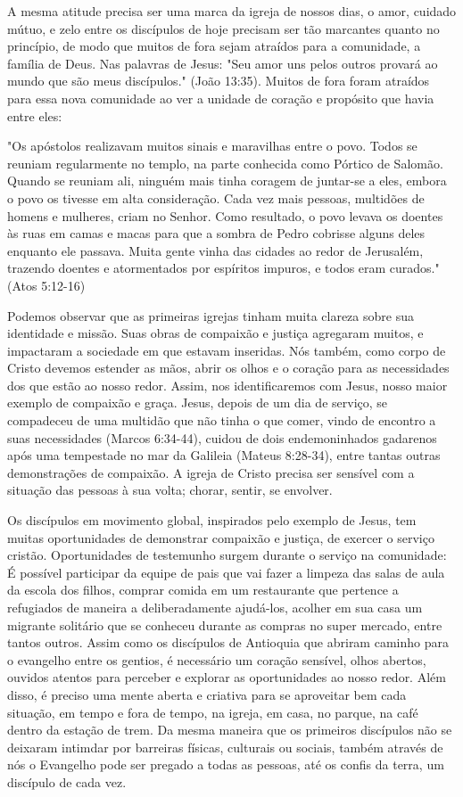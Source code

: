 \documentclass[12pt,openright,oneside,a4paper,
english,french,spanish,brazil]{abntex2}
\begin{document}
A mesma atitude precisa ser uma marca da igreja de nossos dias, o amor, cuidado mútuo, e zelo entre os discípulos de hoje precisam ser tão marcantes quanto no princípio, de modo que muitos de fora sejam atraídos para a comunidade, a família de Deus. Nas palavras de Jesus: "Seu amor uns pelos outros provará ao mundo que são meus discípulos." (João 13:35). Muitos de fora foram atraídos para essa nova comunidade ao ver a unidade de coração e propósito que havia entre eles:

\begin{citacao}"Os apóstolos realizavam muitos sinais e maravilhas entre o povo. Todos se reuniam regularmente no templo, na parte conhecida como Pórtico de Salomão. Quando se reuniam ali, ninguém mais tinha coragem de juntar-se a eles, embora o povo os tivesse em alta consideração. Cada vez mais pessoas, multidões de homens e mulheres, criam no Senhor. Como resultado, o povo levava os doentes às ruas em camas e macas para que a sombra de Pedro cobrisse alguns deles enquanto ele passava. Muita gente vinha das cidades ao redor de Jerusalém, trazendo doentes e atormentados por espíritos impuros, e todos eram curados." (Atos 5:12-16)\end{citacao}

Podemos observar que as primeiras igrejas tinham muita clareza sobre sua identidade e missão. Suas obras de compaixão e justiça agregaram muitos, e impactaram a sociedade em que estavam inseridas. Nós também, como corpo de Cristo devemos estender as mãos, abrir os olhos e o coração para as necessidades dos que estão ao nosso redor. Assim, nos identificaremos com Jesus, nosso maior exemplo de compaixão e graça. Jesus, depois de um dia de serviço, se compadeceu de uma multidão que não tinha o que comer, vindo de encontro a suas necessidades (Marcos 6:34-44), cuidou de dois endemoninhados gadarenos após uma tempestade no mar da Galileia (Mateus 8:28-34), entre tantas outras demonstrações de compaixão. A igreja de Cristo precisa ser sensível com a situação das pessoas à sua volta; chorar, sentir, se envolver\cite[p. 172]{brandao}.

Os discípulos em movimento global, inspirados pelo exemplo de Jesus, tem muitas oportunidades de demonstrar compaixão e justiça, de exercer o serviço cristão. Oportunidades de testemunho surgem durante o serviço na comunidade: É possível participar da equipe de pais que vai fazer a limpeza das salas de aula da escola dos filhos, comprar comida em um restaurante que pertence a refugiados de maneira a deliberadamente ajudá-los, acolher em sua casa um migrante solitário que se conheceu durante as compras no super mercado, entre tantos outros. Assim como os discípulos de Antioquia que abriram caminho para o evangelho entre os gentios, é necessário um coração sensível, olhos abertos, ouvidos atentos para perceber e explorar as oportunidades ao nosso redor. Além disso, é preciso uma mente aberta e criativa para se aproveitar bem cada situação, em tempo e fora de tempo, na igreja, em casa, no parque, na café dentro da estação de trem. Da mesma maneira que os primeiros discípulos não se deixaram intimdar por barreiras físicas, culturais ou sociais, também através de nós o Evangelho pode ser pregado a todas as pessoas, até os confis da terra, um discípulo de cada vez.
\end{document}
